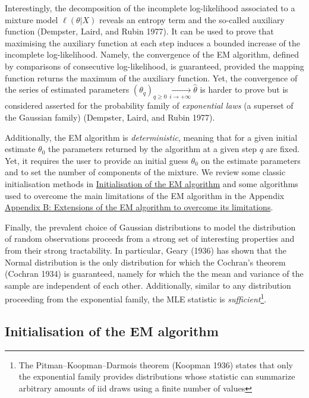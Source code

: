 Interestingly, the decomposition of the incomplete log-likelihood
associated to a mixture model \(\ell(\theta|X)\) reveals an entropy term
and the so-called auxiliary function (Dempster, Laird, and Rubin 1977). It can be used to prove that
maximising the auxiliary function at each step induces a bounded
increase of the incomplete log-likelihood. Namely, the convergence of
the EM algorithm, defined by comparisons of consecutive log-likelihood,
is guaranteed, provided the mapping function returns the maximum of the
auxiliary function. Yet, the convergence of the series of estimated
parameters
\((\theta_q)_{q \ge 0} \underset{i\to +\infty}{\longrightarrow} \hat{\theta}\)
is harder to prove but is considered asserted for the probability family
of \emph{exponential laws} (a superset of the Gaussian family)
(Dempster, Laird, and Rubin 1977).

Additionally, the EM algorithm is \emph{deterministic}, meaning that for a
given initial estimate \(\theta_0\) the parameters returned by the
algorithm at a given step \(q\) are fixed. Yet, it requires the user to
provide an initial guess \(\theta_0\) on the estimate parameters and to
set the number of components of the mixture. We review some classic
initialisation methods in \protect\hyperlink{initialisation-of-the-em-algorithm}{Initialisation of the EM algorithm} and some
algorithms used to overcome the main limitations of the EM
algorithm in the Appendix \protect\hyperlink{appendix-b-extensions-of-the-em-algorithm-to-overcome-its-limitations}{Appendix B: Extensions of the EM algorithm to overcome its limitations}.

Finally, the prevalent choice of Gaussian distributions to model the distribution of random observations proceeds from a strong set of interesting properties and from their strong tractability. In particular, Geary (1936) has shown that the Normal distribution is the only distribution for which the Cochran's theorem (Cochran 1934) is guaranteed, namely for which the the mean and variance of the sample are independent of each other. Additionally, similar to any distribution proceeding from the exponential family, the MLE statistic is \emph{sufficient}\footnote{The Pitman--Koopman--Darmois theorem (Koopman 1936) states that only the exponential family provides distributions whose statistic can summarize arbitrary amounts of iid draws using a finite number of values}.

\hypertarget{initialisation-of-the-em-algorithm}{%
\subsection{Initialisation of the EM algorithm}\label{initialisation-of-the-em-algorithm}}

